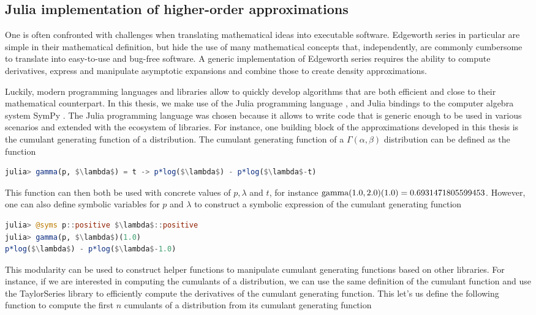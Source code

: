\subsection{Julia implementation of higher-order approximations}
One is often confronted with challenges when translating mathematical ideas into executable software. Edgeworth series in particular are simple in their mathematical definition, but hide the use of many mathematical concepts that, independently, are commonly cumbersome to translate into easy-to-use and bug-free software. A generic implementation of Edgeworth series requires the ability to compute derivatives, express and manipulate asymptotic expansions and combine those to create density approximations.

Luckily, modern programming languages and libraries allow to quickly develop algorithms that are both efficient and close to their mathematical counterpart. In this thesis, we make use of the Julia programming language \cite{bezanson2017julia}, and Julia bindings to the computer algebra system SymPy \cite{sympy}. The Julia programming language was chosen because it allows to write code that is generic enough to be used in various scenarios and extended with the ecosystem of libraries. For instance, one building block of the approximations developed in this thesis is the cumulant generating function of a distribution. The cumulant generating function of a $\Gamma(\alpha, \beta)$ distribution can be defined as the function
\begin{lstlisting}[language=Julia, mathescape, escapechar=\%]
julia> gamma(p, $\lambda$) = t -> p*log($\lambda$) - p*log($\lambda$-t)
\end{lstlisting}
This function can then both be used with concrete values of $p, \lambda$ and $t$, for instance ${\textrm{gamma}}(1.0, 2.0)(1.0) = 0.6931471805599453$. However, one can also define symbolic variables for $p$ and $\lambda$ to construct a symbolic expression of the cumulant generating function
\begin{lstlisting}[language=Julia, mathescape, escapechar=\%]
julia> @syms p::positive $\lambda$::positive
julia> gamma(p, $\lambda$)(1.0)
p*log($\lambda$) - p*log($\lambda$-1.0)
\end{lstlisting}
This modularity can be used to construct helper functions to manipulate cumulant generating functions based on other libraries. For instance, if we are interested in computing the cumulants of a distribution, we can use the same definition of the cumulant function and use the TaylorSeries \cite{TaylorSeries} library to efficiently compute the derivatives of the cumulant generating function. This let's us define the following function to compute the first $n$ cumulants of a distribution from its cumulant generating function
